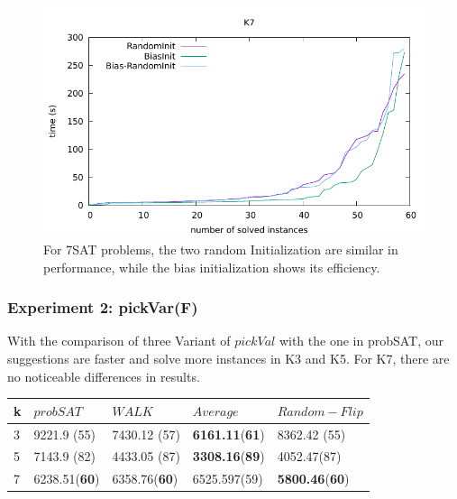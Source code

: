 \documentclass[12pt,a4paper,twoside]{scrartcl}
\numberwithin{equation}{section}
\begin{document}
  \begin{figure}[H]
\begin{center}
  \includegraphics[scale = 1]{DATA/K7/e1.pdf}
  \end{center}
  \caption{For 7SAT problems, the two random Initialization are similar in performance, while the bias initialization shows its efficiency.}
  \label{Experiment 1 k7 cactus plot}
  \end{figure}
  \clearpage
\subsubsection{Experiment 2: pickVar(F)}  
With the comparison of three Variant of $pickVal$ with the one in probSAT, our suggestions are faster and solve more instances in K3 and K5.  For K7,  there are no noticeable differences in results.
\begin{table}[h!]
\begin{center}
    \begin{tabular}{|l|l|l|l|p{3cm}|}
\hline 
    k &$probSAT$&$WALK$&$Average$&$Random-Flip$ \\ \hline
	3&9221.9 (55)&7430.12 (57)&\textbf{6161.11}(\textbf{61})&8362.42 (55) \\ \hline
	5&7143.9 (82)&4433.05 (87)&\textbf{3308.16}(\textbf{89})&4052.47(87)\\ \hline

	7& 	6238.51(\textbf{60})& 6358.76(\textbf{60})&6525.597(59)&\textbf{5800.46}(\textbf{60})\\ \hline
	
\end{tabular}
\end{center}
\end{table} 
\end{document}

